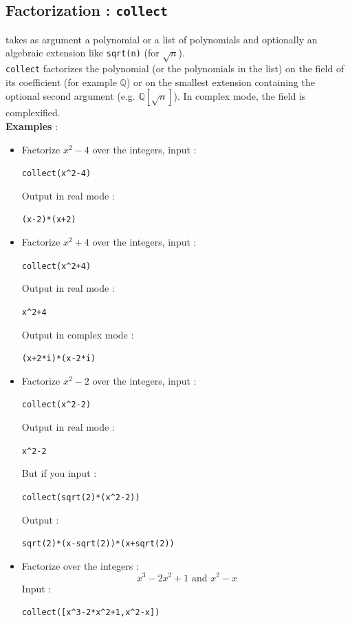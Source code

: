 \documentclass[a4paper,11pt]{book}
\begin{document}
\subsection{Factorization : {\tt collect}}
 takes as argument a polynomial or a list of 
polynomials and optionally an algebraic extension like {\tt sqrt(n)}
(for $\sqrt{n}$).\\
{\tt collect} factorizes the polynomial (or the polynomials in the
list) on the field of its coefficient (for example $\mathbb Q$)
or on the smallest extension containing the optional second argument (e.g.
$\mathbb Q[\sqrt{n}]$). In complex mode, the field is complexified.\\
{\bf Examples} :
\begin{itemize}
\item Factorize $x^2-4$ over the integers,
input :
\begin{center}{\tt collect(x\verb|^|2-4)}\end{center}
Output in real mode :
\begin{center}{\tt (x-2)*(x+2)}\end{center}
\item Factorize $x^2+4$ over the integers, input :
\begin{center}{\tt collect(x\verb|^|2+4)}\end{center}
Output  in real mode :
\begin{center}{\tt x\verb|^|2+4}\end{center}
Output  in complex mode :
\begin{center}{\tt (x+2*i)*(x-2*i)}\end{center}
\item Factorize $x^2-2$ over the integers, input :
\begin{center}{\tt collect(x\verb|^|2-2)}\end{center}
Output in real mode :
\begin{center}{\tt x\verb|^|2-2}\end{center}
But if you input :
\begin{center}{\tt collect(sqrt(2)*(x\verb|^|2-2))}\end{center}
Output :
\begin{center}{\tt sqrt(2)*(x-sqrt(2))*(x+sqrt(2))}\end{center}
\item Factorize over the integers : 
$$x^3-2x^2+1 \mbox{ and } x^2-x$$
Input :
 \begin{center}{\tt collect([x\verb|^|3-2*x\verb|^|2+1,x\verb|^|2-x])}\end{center}

\end{itemize}
\end{document}
